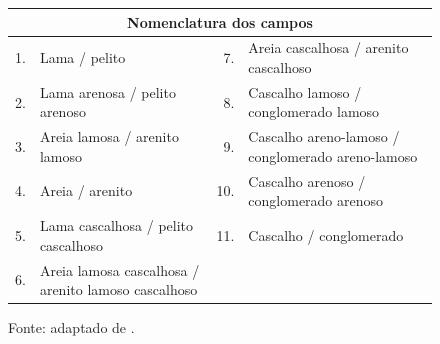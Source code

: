 \begin{figure}[H]
  \vspace{0.5em}
  \begin{tabularx}{0.98\linewidth}{@{}rX rX@{}}
    \toprule
    \multicolumn{4}{c}{\textbf{Nomenclatura dos campos}} \\
    \midrule
    1. & Lama / pelito
       & 7. & Areia cascalhosa / arenito cascalhoso \\
    2. & Lama arenosa / pelito arenoso
       & 8. & Cascalho lamoso / conglomerado lamoso \\
    3. & Areia lamosa / arenito lamoso
       & 9. & Cascalho areno-lamoso / conglomerado areno-lamoso \\
    4. & Areia / arenito
       & 10. & Cascalho arenoso / conglomerado arenoso \\
    5. & Lama cascalhosa / pelito cascalhoso
       & 11. & Cascalho / conglomerado \\
    6. & Areia lamosa cascalhosa / arenito lamoso cascalhoso
       & & \\
    \bottomrule
  \end{tabularx}
  \caption{Classificação textural de sedimentos e rochas formados por misturas de
  cascalho, areia e lama. Os limites de 5, 30 e 80\% referem-se à proporção de
  cascalho.}
  \label{fig:classificacao-conglomerados}
  \caption*{\footnotesize Fonte: adaptado de \textcite{nichols2009}.}
\end{figure}
